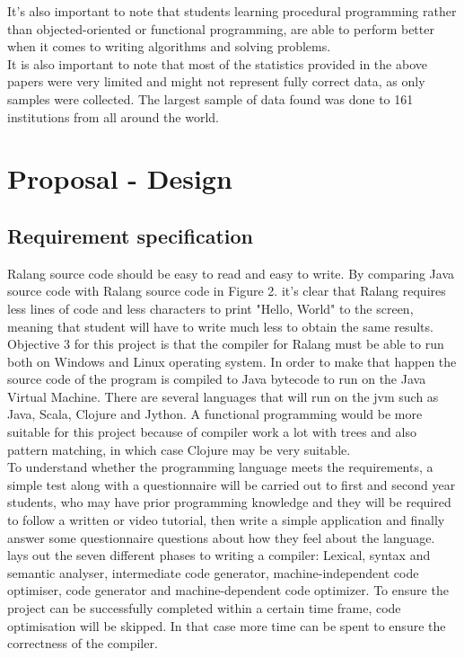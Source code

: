 \documentclass[a4paper]{article}
\begin{document}
\begin{appendices}
	It's also important to note that students learning procedural programming rather than objected-oriented or functional programming, are able to perform better when it comes to writing algorithms and solving problems. \parencite{Kolling1999}\\
	
	It is also important to note that most of the statistics provided in the above papers were very limited and might not represent fully correct data, as only samples were collected. The largest sample of data found was done to 161 institutions from all around the world.
	\newpage
	\section{Proposal - Design}
	\label{App:ProposalDesign}
	\subsection{Requirement specification}
	\label{App:RequirementSpecification}
	Ralang source code should be easy to read and easy to write. By comparing Java source code with Ralang source code in Figure 2. it's clear that Ralang requires less lines of code and less characters to print "Hello, World" to the screen, meaning that student will have to write much less to obtain the same results.\\
	
	Objective 3 for this project is that the compiler for Ralang must be able to run both on Windows and Linux operating system. In order to make that happen the source code of the program is compiled to Java bytecode to run on the Java Virtual Machine. There are several languages that will run on the \ac{jvm} such as Java, Scala, Clojure and Jython. A functional programming would be more suitable for this project because of compiler work a lot with trees and also pattern matching, in which case Clojure may be very suitable.\\
	
	To understand whether the programming language meets the requirements, a simple test along with a questionnaire will be carried out to first and second year students, who may have prior programming knowledge and they will be required to follow a written or video tutorial, then write a simple application and finally answer some questionnaire questions about how they feel about the language.\\
	
	\textcite{AhoLamSethiUllman2006} lays out the seven different phases to writing a compiler: Lexical, syntax and semantic analyser, intermediate code generator, machine-independent code optimiser, code generator and machine-dependent code optimizer. To ensure the project can be successfully completed within a certain time frame, code optimisation will be skipped. In that case more time can be spent to ensure the correctness of the compiler.\\
	

\end{appendices}
\end{document}
